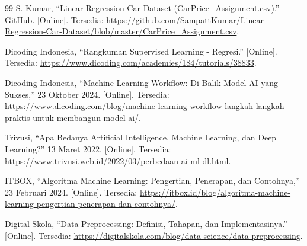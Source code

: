 \documentclass[a4paper,oneside,12pt]{report}
\begin{document}
\begin{thebibliography}{99}
     S. Kumar, ``Linear Regression Car Dataset (CarPrice\_Assignment.csv).'' GitHub. [Online]. Tersedia: \url{https://github.com/SampattKumar/Linear-Regression-Car-Dataset/blob/master/CarPrice_Assignment.csv}.

     Dicoding Indonesia, ``Rangkuman Supervised Learning - Regresi.'' [Online]. Tersedia: \url{https://www.dicoding.com/academies/184/tutorials/38833}.

     Dicoding Indonesia, ``Machine Learning Workflow: Di Balik Model AI yang Sukses,'' 23 Oktober 2024. [Online]. Tersedia: \url{https://www.dicoding.com/blog/machine-learning-workflow-langkah-langkah-praktis-untuk-membangun-model-ai/}.

     Trivusi, ``Apa Bedanya Artificial Intelligence, Machine Learning, dan Deep Learning?'' 13 Maret 2022. [Online]. Tersedia: \url{https://www.trivusi.web.id/2022/03/perbedaan-ai-ml-dl.html}.

     ITBOX, ``Algoritma Machine Learning: Pengertian, Penerapan, dan Contohnya,'' 23 Februari 2024. [Online]. Tersedia: \url{https://itbox.id/blog/algoritma-machine-learning-pengertian-penerapan-dan-contohnya/}.

     Digital Skola, ``Data Preprocessing: Definisi, Tahapan, dan Implementasinya.'' [Online]. Tersedia: \url{https://digitalskola.com/blog/data-science/data-preprocessing}.

\end{thebibliography}
\end{document}
